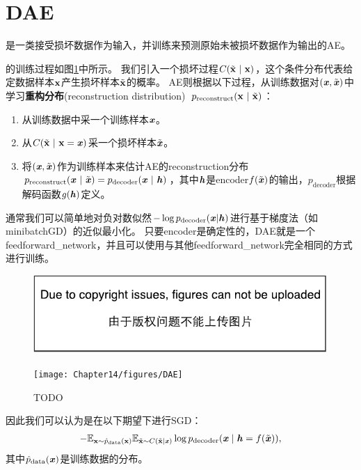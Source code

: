\section{\gls{DAE}}
\label{sec:denoising_autoencoders}
是一类接受损坏数据作为输入，并训练来预测原始未被损坏数据作为输出的\gls{AE}。


的训练过程如图\ref{fig:chap14_DAE}中所示。
我们引入一个损坏过程$C(\tilde{\mathbf{x}} ~|~ \mathbf{x})$，这个条件分布代表给定数据样本$\mathbf{x}$产生损坏样本$\tilde {\mathbf{x}}$的概率。
\gls{AE}则根据以下过程，从训练数据对$(\boldsymbol{\mathit{x}}, \tilde {\boldsymbol{\mathit{x}}})$中学习\textbf{重构分布}(reconstruction distribution)~$p_{\text{reconstruct}} (\mathbf{x} ~|~ \tilde {\mathbf{x}})$：
\begin{enumerate}
\item 从训练数据中采一个训练样本$\boldsymbol{\mathit{x}}$。
\item 从$C(\tilde{\mathbf{x}} ~|~ \mathbf{x}=\boldsymbol{\mathit{x}})$采一个损坏样本$\tilde {\boldsymbol{\mathit{x}}}$。
\item 将$(\boldsymbol{\mathit{x}}, \tilde {\boldsymbol{\mathit{x}}})$作为训练样本来估计\gls{AE}的\gls{reconstruction}分布 
$p_{\text{reconstruct}} (\boldsymbol{\mathit{x}} ~|~ \tilde {\boldsymbol{\mathit{x}}}) = p_{\text{decoder}}(\boldsymbol{\mathit{x}} ~|~\boldsymbol{\mathit{h}})$，其中$\boldsymbol{\mathit{h}}$是\gls{encoder}$f(\tilde {\boldsymbol{\mathit{x}}})$的输出，$p_{\text{decoder}}$根据解码函数$g(\boldsymbol{\mathit{h}})$定义。
\end{enumerate}
通常我们可以简单地对负对数似然$-\log p_{\text{decoder}} (\boldsymbol{\mathit{x}} | \boldsymbol{\mathit{h}})$进行基于梯度法（如\gls{minibatch}\gls{GD}）的近似最小化。
只要\gls{encoder}是确定性的，\gls{DAE}就是一个\gls{feedforward_network}，并且可以使用与其他\gls{feedforward_network}完全相同的方式进行训练。

\begin{figure}[!htb]
\ifOpenSource
\centerline{\includegraphics{figure.pdf}}
\else
\centerline{\texttt{[image: Chapter14/figures/DAE]}}
\fi
\caption{TODO}
\label{fig:chap14_DAE}
\end{figure}

因此我们可以认为是在以下期望下进行\gls{SGD}：
\begin{align}
   - \mathbb{E}_{\mathbf{x} \sim \hat{p}_{\text{data}}(\mathbf{x})} \mathbb{E}_{\tilde{\mathbf{x}} \sim C(\tilde{\mathbf{x}}\mid\boldsymbol{\mathit{x}})} \log p_{\text{decoder}}(\boldsymbol{\mathit{x}} \mid \boldsymbol{\mathit{h}} = f(\tilde{\boldsymbol{\mathit{x}}})),
\end{align}
其中$\hat{p}_{\text{data}}(\boldsymbol{\mathit{x}})$是训练数据的分布。

